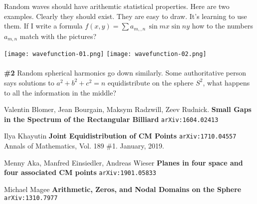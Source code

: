 \documentclass[12pt]{article}
\begin{document}
\newpage \noindent 
Random waves should have arithemtic statistical properties. Here are two examples.  Clearly they should exist.  They are easy to draw.  It's learning to use them.  If I write a formula $f(x,y) = \sum a_{m,,n} \, \sin mx \sin n y$ how to the numbers $a_{m,n}$ match with the pictures?

\texttt{[image: wavefunction-01.png]}
\texttt{[image: wavefunction-02.png]} \\ \\

\textbf{\#2} Random spherical harmonics go down similarly.  Some authoritative person says solutions to $a^2 + b^2 + c^2 = n$ equidistribute on the sphere $S^2$, what happens to all the information in the middle?

\vfill 

\begin{thebibliography}{}

\item Valentin Blomer, Jean Bourgain, Maksym Radzwill, Zeev Rudnick. \textbf{Small Gaps in the Spectrum of the Rectangular Billiard} \texttt{arXiv:1604.02413}

\item Ilya Khayutin \textbf{Joint Equidistribution of CM Points} \texttt{arXiv:1710.04557} \\
Annals of Mathematics,  Vol. 189 \#1.  January, 2019.

\item Menny Aka, Manfred Einsiedler, Andreas Wieser \textbf{Planes in four space and four associated CM points} \texttt{arXiv:1901.05833}

\item Michael Magee \textbf{Arithmetic, Zeros, and Nodal Domains on the Sphere} \texttt{arXiv:1310.7977}

\end{thebibliography}
\end{document}

